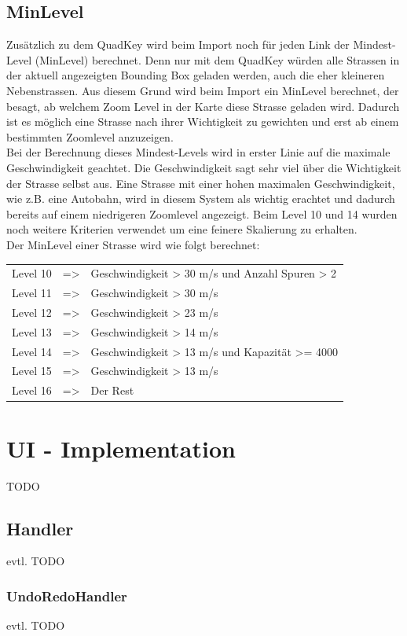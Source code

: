 \subsection{MinLevel}
Zusätzlich zu dem QuadKey wird beim Import noch für jeden Link der Mindest-Level (MinLevel) berechnet. Denn nur mit dem QuadKey würden alle Strassen in der aktuell angezeigten Bounding Box geladen werden, auch die eher kleineren Nebenstrassen. Aus diesem Grund wird beim Import ein MinLevel berechnet, der besagt, ab welchem Zoom Level in der Karte diese Strasse geladen wird. Dadurch ist es möglich eine Strasse nach ihrer Wichtigkeit zu gewichten und erst ab einem bestimmten Zoomlevel anzuzeigen. \\
Bei der Berechnung dieses Mindest-Levels wird in erster Linie auf die maximale  Geschwindigkeit geachtet. Die Geschwindigkeit sagt sehr viel über die Wichtigkeit der Strasse selbst aus. Eine Strasse mit einer hohen maximalen Geschwindigkeit, wie z.B. eine Autobahn, wird in diesem System als wichtig erachtet und dadurch bereits auf einem niedrigeren Zoomlevel angezeigt. Beim Level 10 und 14 wurden noch weitere Kriterien verwendet um eine feinere Skalierung zu erhalten.\\
Der MinLevel einer Strasse wird wie folgt berechnet:\\[0.3cm]
\begin{tabular}{l c l} 
Level 10 & => & Geschwindigkeit > 30 m/s und Anzahl Spuren > 2 \\ 
Level 11 & => & Geschwindigkeit > 30 m/s  \\ 
Level 12 & => & Geschwindigkeit > 23 m/s \\ 
Level 13 & => & Geschwindigkeit > 14 m/s \\ 
Level 14 & => & Geschwindigkeit > 13 m/s und Kapazität >= 4000  \\ 
Level 15 & => & Geschwindigkeit > 13 m/s \\ 
Level 16 & => & Der Rest \\ 
\end{tabular} 
\section{UI - Implementation}
TODO
\subsection{Handler}
evtl. TODO
\subsubsection{UndoRedoHandler}
evtl. TODO
